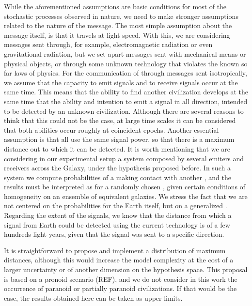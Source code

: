 While the aforementioned assumptions are basic conditions for most of
the stochastic processes observed in nature, we need to make stronger
assumptions related to the nature of the message.
%
The most simple assumption about the message itself, is that it
travels at light speed.
%
With this, we are considering messages sent through, for example,
electromagnetic radiation or even gravitational radiation, but we set
apart messages sent with mechanical means or physical objects, or
through some unknown technology that violates the known so far laws of
physics.
% 
For the communication of \cetis{} through messages sent isotropically, we
assume that the capacity to emit signals and to receive signals occur
at the same time.
%
This means that the ability to find another civilization develops at
the same time that the ability and intention to emit a signal in all
direction, intended to be detected by an unknown civilization.
%
Although there are several reasons to think that this could not be the
case, at large time scales it can be considered that both abilities
occur roughly at coincident epochs.
%
Another essential assumption is that all \cetis{} use the same signal
power, so that there is a maximum distance out to which it can be
detected.
%
It is worth mentioning that we are considering in our experimental
setup a system composed by several emiters and receivers across the
Galaxy, under the hypothesis proposed before.
%
In such a system we compute probabilities of a \ceti{} making contact
with another \ceti{}, and the results must be interpreted as for a
randomly chosen \ceti{}, given certain conditions of homogeneity on an
ensemble of equivalent galaxies.
%
We stress the fact that we are not centered on the probabilities for
the Earth itself, but on a generalized \ceti{}.
%
Regarding the extent of the signals, we know that the distance from
which a signal from Earth could be detected using the current
technology is of a few hundreds light years, given that the signal was
sent to a specific direction.

               

%
It is straightforward to propose and implement a distribution of
maximum distances, although this would increase the model complexity
at the cost of a larger uncertainty or of another dimension on the
hypothesis space.
%
This proposal is based on a pronoid scenario (REF), and we do not
consider in this work the occurrence of paranoid or partially paranoid
civilizations.
%
If that would be the case, the results obtained here can be taken as
upper limits.



